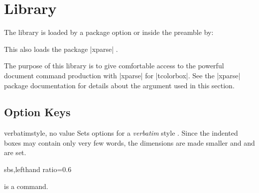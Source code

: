\clearpage
\section{Library }\label{sec:xparse}%
%
The library is loaded by a package option or inside the preamble by:
\begin{dispListing}
\end{dispListing}
This also loads the package |xparse| \cite{latexproject:xparse}.

The purpose of this library is to give comfortable access to the
powerful document command production with |xparse| for |tcolorbox|.
See the |xparse| package documentation \cite{latexproject:xparse}
for details about the argument  used in this section.



\subsection{Option Keys}\label{subsec:xparse_options}

\begin{docTcbKey}{verbatim}{}{style, no value}
  Sets options for a \textit{verbatim} style .
  Since the indented boxes may contain only very few words, the
  dimensions are made smaller and 
  and  are set.
\begin{dispExample*}{sbs,lefthand ratio=0.6}

\myverb{\textbf} is a \myverb{\LaTeX} command.
\end{dispExample*}
\end{docTcbKey}


